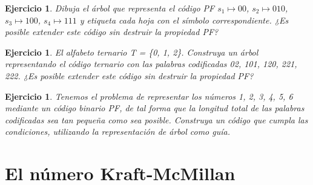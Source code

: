 \documentclass{beamer}
\newtheorem{ejercicio} [Corolario]{Ejercicio}
\begin{document}
\begin{frame}      \small
 

 
 \begin{ejercicio}
Dibuja el árbol que representa el código PF $s_{1}  \mapsto 00$,  $s_{2}  \mapsto 010$,  $s_{3}  \mapsto 100$,  $s_{4}  \mapsto 111$ y etiqueta cada hoja con el símbolo correspondiente. ¿Es posible extender este código sin destruir la propiedad PF?
\end{ejercicio}


 \begin{ejercicio}
El alfabeto ternario T = \{0, 1, 2\}. Construya un árbol representando el código ternario con las palabras codificadas 02, 101, 120, 221, 222. ¿Es posible extender este código sin destruir la propiedad PF?
\end{ejercicio}

 \begin{ejercicio}
Tenemos el problema de representar los números 1, 2, 3, 4, 5, 6 mediante un  código binario PF, de tal forma que la longitud total de las palabras codificadas sea tan pequeña como sea posible. Construya un código que cumpla las condiciones, utilizando la representación de árbol como guía.


\end{ejercicio}

\end{frame}


\section{El número Kraft-McMillan}
\end{document}
